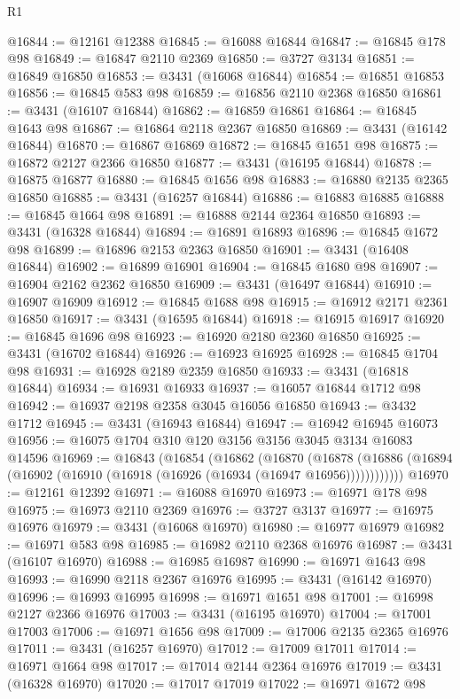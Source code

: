 \begin{lexlean}{R1}
\begin{coremodule}
@16844 := @12161 @12388
@16845 := @16088 @16844
@16847 := @16845 @178 @98
@16849 := @16847 @2110 @2369
@16850 := @3727 @3134
@16851 := @16849 @16850
@16853 := @3431 (@16068 @16844)
@16854 := @16851 @16853
@16856 := @16845 @583 @98
@16859 := @16856 @2110 @2368 @16850
@16861 := @3431 (@16107 @16844)
@16862 := @16859 @16861
@16864 := @16845 @1643 @98
@16867 := @16864 @2118 @2367 @16850
@16869 := @3431 (@16142 @16844)
@16870 := @16867 @16869
@16872 := @16845 @1651 @98
@16875 := @16872 @2127 @2366 @16850
@16877 := @3431 (@16195 @16844)
@16878 := @16875 @16877
@16880 := @16845 @1656 @98
@16883 := @16880 @2135 @2365 @16850
@16885 := @3431 (@16257 @16844)
@16886 := @16883 @16885
@16888 := @16845 @1664 @98
@16891 := @16888 @2144 @2364 @16850
@16893 := @3431 (@16328 @16844)
@16894 := @16891 @16893
@16896 := @16845 @1672 @98
@16899 := @16896 @2153 @2363 @16850
@16901 := @3431 (@16408 @16844)
@16902 := @16899 @16901
@16904 := @16845 @1680 @98
@16907 := @16904 @2162 @2362 @16850
@16909 := @3431 (@16497 @16844)
@16910 := @16907 @16909
@16912 := @16845 @1688 @98
@16915 := @16912 @2171 @2361 @16850
@16917 := @3431 (@16595 @16844)
@16918 := @16915 @16917
@16920 := @16845 @1696 @98
@16923 := @16920 @2180 @2360 @16850
@16925 := @3431 (@16702 @16844)
@16926 := @16923 @16925
@16928 := @16845 @1704 @98
@16931 := @16928 @2189 @2359 @16850
@16933 := @3431 (@16818 @16844)
@16934 := @16931 @16933
@16937 := @16057 @16844 @1712 @98
@16942 := @16937 @2198 @2358 @3045 @16056 @16850
@16943 := @3432 @1712
@16945 := @3431 (@16943 @16844)
@16947 := @16942 @16945 @16073
@16956 := @16075 @1704 @310 @120 @3156 @3156 @3045 @3134 @16083 @14596
@16969 := @16843
    (@16854
      (@16862
        (@16870
          (@16878 (@16886 (@16894 (@16902 (@16910 (@16918 (@16926 (@16934 (@16947 @16956))))))))))))
@16970 := @12161 @12392
@16971 := @16088 @16970
@16973 := @16971 @178 @98
@16975 := @16973 @2110 @2369
@16976 := @3727 @3137
@16977 := @16975 @16976
@16979 := @3431 (@16068 @16970)
@16980 := @16977 @16979
@16982 := @16971 @583 @98
@16985 := @16982 @2110 @2368 @16976
@16987 := @3431 (@16107 @16970)
@16988 := @16985 @16987
@16990 := @16971 @1643 @98
@16993 := @16990 @2118 @2367 @16976
@16995 := @3431 (@16142 @16970)
@16996 := @16993 @16995
@16998 := @16971 @1651 @98
@17001 := @16998 @2127 @2366 @16976
@17003 := @3431 (@16195 @16970)
@17004 := @17001 @17003
@17006 := @16971 @1656 @98
@17009 := @17006 @2135 @2365 @16976
@17011 := @3431 (@16257 @16970)
@17012 := @17009 @17011
@17014 := @16971 @1664 @98
@17017 := @17014 @2144 @2364 @16976
@17019 := @3431 (@16328 @16970)
@17020 := @17017 @17019
@17022 := @16971 @1672 @98

\end{coremodule}
\end{lexlean}
